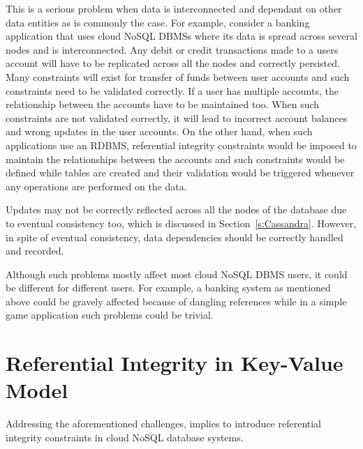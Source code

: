 This is a serious problem when data is interconnected and dependant on other
data entities as is commonly the case.  For example,   consider a banking
application that uses cloud \ac{NoSQL} \acp{DBMS} where its data is spread
across several nodes and is interconnected.  Any debit or credit
transactions made to a users account will have to be replicated across all the
nodes and correctly persisted.  Many constraints will exist for transfer of funds
between user accounts and such constraints need to be validated correctly.  If a
user has multiple accounts,   the relationship between the accounts have to be
maintained too.  When such constraints are not validated correctly,   it will lead
to incorrect account balances and wrong updates in the user accounts.  On the
other hand,   when such applications use an \ac{RDBMS},   referential integrity
constraints would be imposed to maintain the relationships between the
accounts and such constraints would be defined while tables are created and
their validation would be triggered whenever any operations are performed on the
data. 

Updates may not be correctly reflected across all the nodes of the database due
to  eventual consistency too,   which is discussed in Section~\ref{s:Cassandra}. 
However, in spite of eventual consistency,   data dependencies should be correctly handled and
recorded. 

Although such problems mostly affect most cloud \ac{NoSQL} \ac{DBMS} users,   it
could be different for different users.  For example,   a banking system as
mentioned above could be gravely affected because of dangling references while
in a simple game application such problems could be trivial. 




\section{Referential Integrity in Key-Value
Model}\label{s:referential-integrity}
Addressing the aforementioned challenges,   implies to introduce referential
integrity constraints in cloud \ac{NoSQL} database systems. 

